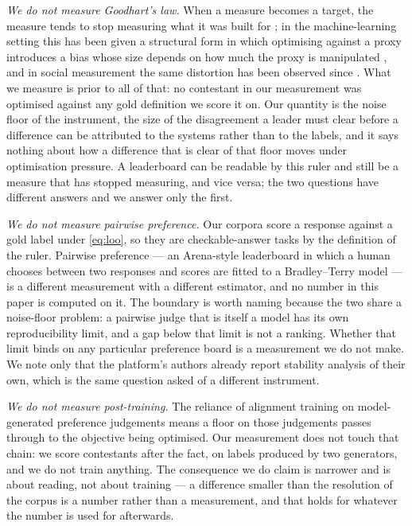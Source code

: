 \documentclass{article}
\begin{document}
\emph{We do not measure Goodhart's law.} When a measure becomes a target, the measure tends to stop measuring what it was built for \cite{goodhart1984}; in the machine-learning setting this has been given a structural form in which optimising against a proxy introduces a bias whose size depends on how much the proxy is manipulated \cite{hennessygoodhart2023}, and in social measurement the same distortion has been observed since \cite{campbell2011}. What we measure is prior to all of that: no contestant in our measurement was optimised against any gold definition we score it on. Our quantity is the noise floor of the instrument, the size of the disagreement a leader must clear before a difference can be attributed to the systems rather than to the labels, and it says nothing about how a difference that is clear of that floor moves under optimisation pressure. A leaderboard can be readable by this ruler and still be a measure that has stopped measuring, and vice versa; the two questions have different answers and we answer only the first.

\emph{We do not measure pairwise preference.} Our corpora score a response against a gold label under \eqref{eq:loo}, so they are checkable-answer tasks by the definition of the ruler. Pairwise preference --- an Arena-style leaderboard in which a human chooses between two responses and scores are fitted to a Bradley--Terry model \cite{chiang2024chatbotarena,bradleyterry1952} --- is a different measurement with a different estimator, and no number in this paper is computed on it. The boundary is worth naming because the two share a noise-floor problem: a pairwise judge that is itself a model has its own reproducibility limit, and a gap below that limit is not a ranking. Whether that limit binds on any particular preference board is a measurement we do not make. We note only that the platform's authors already report stability analysis of their own, which is the same question asked of a different instrument.

\emph{We do not measure post-training.} The reliance of alignment training on model-generated preference judgements \cite{ouyang2022rlhf,rafailov2023dpo} means a floor on those judgements passes through to the objective being optimised. Our measurement does not touch that chain: we score contestants after the fact, on labels produced by two generators, and we do not train anything. The consequence we do claim is narrower and is about reading, not about training --- a difference smaller than the resolution of the corpus is a number rather than a measurement, and that holds for whatever the number is used for afterwards.
\end{document}
